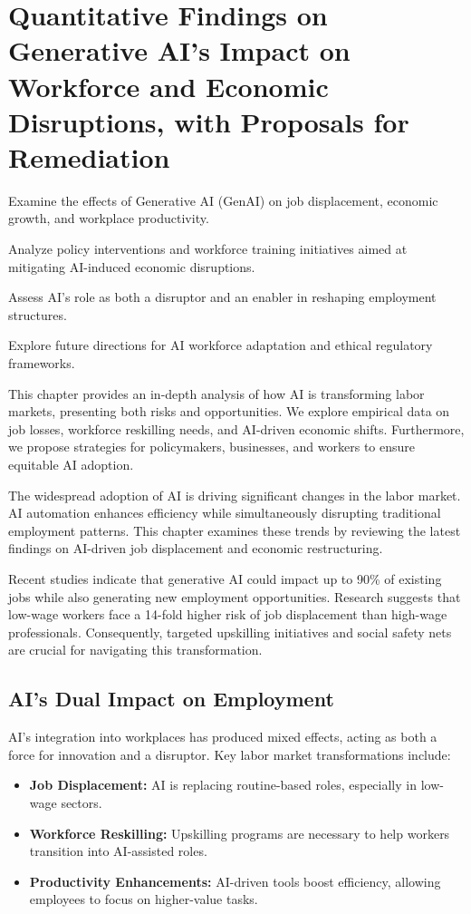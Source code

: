 \documentclass[a4paper,headinclude=on,footinclude=on,12pt,oneside]{scrbook}
\begin{document}
\chapter{Quantitative Findings on Generative AI’s Impact on Workforce and Economic Disruptions, with Proposals for Remediation}

\begin{arrows}
	\item Examine the effects of Generative AI (GenAI) on job displacement, economic growth, and workplace productivity.
	\item Analyze policy interventions and workforce training initiatives aimed at mitigating AI-induced economic disruptions.
	\item Assess AI’s role as both a disruptor and an enabler in reshaping employment structures.
	\item Explore future directions for AI workforce adaptation and ethical regulatory frameworks.
\end{arrows}

This chapter provides an in-depth analysis of how AI is transforming labor markets, presenting both risks and opportunities. We explore empirical data on job losses, workforce reskilling needs, and AI-driven economic shifts. Furthermore, we propose strategies for policymakers, businesses, and workers to ensure equitable AI adoption.


The widespread adoption of AI is driving significant changes in the labor market. AI automation enhances efficiency while simultaneously disrupting traditional employment patterns. This chapter examines these trends by reviewing the latest findings on AI-driven job displacement and economic restructuring.

Recent studies indicate that generative AI could impact up to 90\% of existing jobs while also generating new employment opportunities. Research suggests that low-wage workers face a 14-fold higher risk of job displacement than high-wage professionals. Consequently, targeted upskilling initiatives and social safety nets are crucial for navigating this transformation.

\section{AI’s Dual Impact on Employment}

AI’s integration into workplaces has produced mixed effects, acting as both a force for innovation and a disruptor. Key labor market transformations include:
\begin{itemize}
	\item \textbf{Job Displacement:} AI is replacing routine-based roles, especially in low-wage sectors.
	\item \textbf{Workforce Reskilling:} Upskilling programs are necessary to help workers transition into AI-assisted roles.
	\item \textbf{Productivity Enhancements:} AI-driven tools boost efficiency, allowing employees to focus on higher-value tasks.
\end{itemize}
\end{document}
